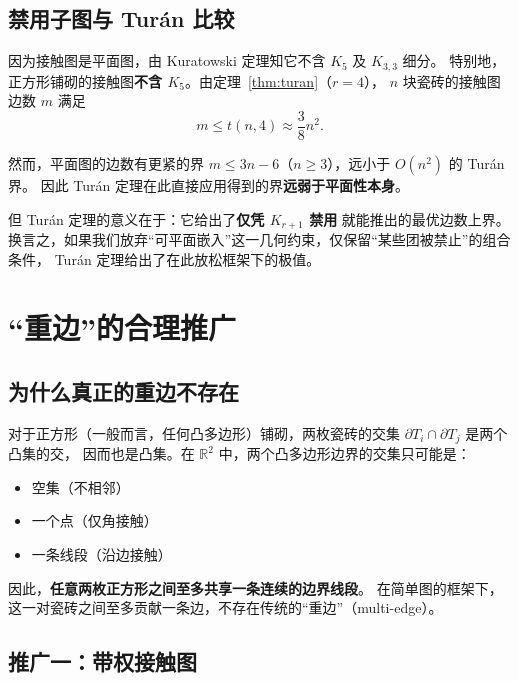 \documentclass[12pt,a4paper]{article}
\theoremstyle{plain}
\theoremstyle{definition}
\theoremstyle{remark}
\begin{document}
\subsection{禁用子图与 Turán 比较}

因为接触图是平面图，由 Kuratowski 定理知它不含 $K_5$ 及 $K_{3,3}$ 细分。
特别地，正方形铺砌的接触图\textbf{不含 $K_5$}。由定理~\ref{thm:turan}（$r=4$），
$n$ 块瓷砖的接触图边数 $m$ 满足
\begin{equation}\label{eq:turan-bound}
m \le t(n,4) \approx \frac{3}{8}n^2 .
\end{equation}

然而，平面图的边数有更紧的界 $m \le 3n-6$（$n \ge 3$），远小于 $O(n^2)$ 的 Turán 界。
因此 Turán 定理在此直接应用得到的界\textbf{远弱于平面性本身}。

但 Turán 定理的意义在于：它给出了\textbf{仅凭 $K_{r+1}$ 禁用} 就能推出的最优边数上界。
换言之，如果我们放弃``可平面嵌入''这一几何约束，仅保留``某些团被禁止''的组合条件，
Turán 定理给出了在此放松框架下的极值。

\section{``重边''的合理推广}

\subsection{为什么真正的重边不存在}

对于正方形（一般而言，任何凸多边形）铺砌，两枚瓷砖的交集 $\partial T_i \cap \partial T_j$ 是两个凸集的交，
因而也是凸集。在 $\mathbb{R}^2$ 中，两个凸多边形边界的交集只可能是：
\begin{itemize}
    \item 空集（不相邻）
    \item 一个点（仅角接触）
    \item 一条线段（沿边接触）
\end{itemize}

因此，\textbf{任意两枚正方形之间至多共享一条连续的边界线段}。
在简单图的框架下，这一对瓷砖之间至多贡献一条边，不存在传统的``重边''（multi-edge）。

\subsection{推广一：带权接触图}
\end{document}
